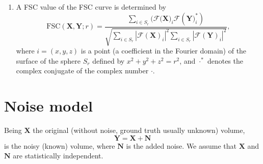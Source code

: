 \documentclass{article}
\begin{document}
\begin{enumerate}
\item
A FSC value of the FSC curve is determined by~\cite{verbeke2024self}
\begin{equation}
\text{FSC}(\mathbf{X}, \mathbf{Y}; r) = \frac{\sum_{i \in S_r} (\mathcal{F}(\mathbf{X)}_i \mathcal{F}(\mathbf{Y)}_i^*)}{\sqrt{\sum_{i \in S_r} |\mathcal{F}(\mathbf{X})_i|^2 \sum_{i \in S_r} |\mathcal{F}(\mathbf{Y})_i|^2}},
\end{equation}
where $i=(x, y, z)$ is a point (a coefficient in the Fourier domain) of the surface of the sphere $S_r$ defined by $x^2+y^2+z^2=r^2$, and $\cdot^*$ denotes the complex conjugate of the complex number $\cdot$.
\end{enumerate}

\section{Noise model}

Being $\mathbf{X}$ the original (without noise, ground truth usually unknown) volume,
\begin{equation}
  \mathbf{Y} = \mathbf{X} + \mathbf{N}
\end{equation}
is the noisy (known) volume, where $\mathbf{N}$ is the added noise. We
assume that $\mathbf{X}$ and $\mathbf{N}$ are statistically
independent.



\end{document}
